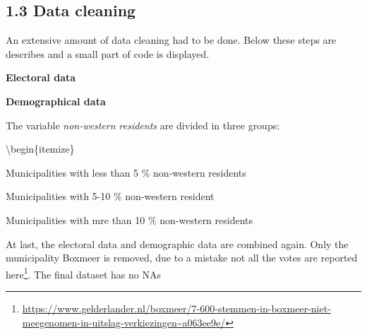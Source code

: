 \documentclass[11pt,]{article}
\newenvironment{Shaded}{\begin{snugshade}}{\end{snugshade}}
\newcommand{\KeywordTok}[1]{\textcolor[rgb]{0.13,0.29,0.53}{\textbf{#1}}}
\newcommand{\DecValTok}[1]{\textcolor[rgb]{0.00,0.00,0.81}{#1}}
\newcommand{\FloatTok}[1]{\textcolor[rgb]{0.00,0.00,0.81}{#1}}
\newcommand{\StringTok}[1]{\textcolor[rgb]{0.31,0.60,0.02}{#1}}
\newcommand{\OtherTok}[1]{\textcolor[rgb]{0.56,0.35,0.01}{#1}}
\newcommand{\OperatorTok}[1]{\textcolor[rgb]{0.81,0.36,0.00}{\textbf{#1}}}
\newcommand{\NormalTok}[1]{#1}
\let\rmarkdownfootnote\footnote%
\def\footnote{\protect\rmarkdownfootnote}
\begin{document}
\subsection{1.3 Data cleaning}\label{data-cleaning}

An extensive amount of data cleaning had to be done. Below these steps
are describes and a small part of code is displayed.

\textbf{Electoral data}

\textbf{Demographical data}

The variable \emph{non-western residents} are divided in three groups:

\textbackslash{}begin\{itemize\} \item Municipalities with less than 5
\% non-western residents \item Municipalities with 5-10 \% non-western
resident \item Municipalities with mre than 10 \% non-western residents

\begin{Shaded}
\end{Shaded}

At last, the electoral data and demographic data are combined again.
Only the municipality Boxmeer is removed, due to a mistake not all the
votes are reported here\footnote{\url{https://www.gelderlander.nl/boxmeer/7-600-stemmen-in-boxmeer-niet-meegenomen-in-uitslag-verkiezingen~a063ee9e/}}.
The final dataset has no NAs
\end{document}
